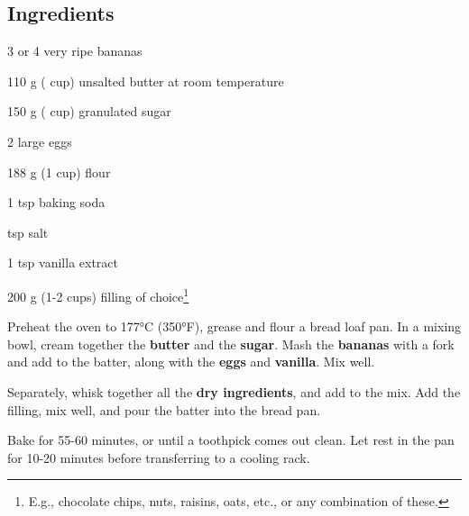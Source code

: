 \newpage
{}
\label{banana_bread}

\subsection*{Ingredients}
\begin{ingredients}
	\item 3 or 4 very ripe bananas
	\item 110 g ( cup) unsalted butter at room temperature
	\item 150 g ( cup) granulated sugar
	\item 2 large eggs
	\item 188 g (1 cup) flour
	\item 1 tsp baking soda
	\item {} tsp salt
	\item 1 tsp vanilla extract 
	\item 200 g (1-2 cups) filling of choice\footnote{E.g., chocolate chips, nuts, raisins, oats, etc., or any combination of these.}
\end{ingredients}

\medskip

Preheat the oven to 177°C (350°F), grease and flour a bread loaf pan.
In a mixing bowl, cream together the \textbf{butter} and the \textbf{sugar}.
Mash the \textbf{bananas} with a fork and add to the batter, along with the \textbf{eggs} and \textbf{vanilla}.
Mix well.

Separately, whisk together all the \textbf{dry ingredients}, and add to the mix.
Add the filling, mix well, and pour the batter into the bread pan.

Bake for 55-60 minutes, or until a toothpick comes out clean.
Let rest in the pan for 10-20 minutes before transferring to a cooling rack. 

\vspace*{0.75 cm}

\begin{recipeblock}

\end{recipeblock}






